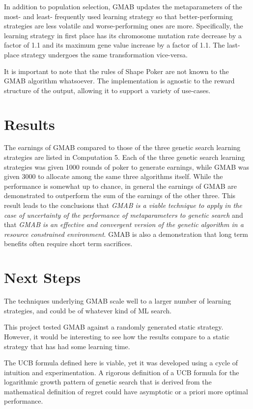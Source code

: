 \documentclass[11pt]{article}
\begin{document}
In addition to population selection, GMAB updates the metaparameters of the most- and least- frequently used learning strategy so that better-performing strategies are less volatile and worse-performing ones are more. Specifically, the learning strategy in first place has its chromosome mutation rate decrease by a factor of 1.1 and its maximum gene value increase by a factor of 1.1. The last-place strategy undergoes the same transformation vice-versa.

It is important to note that the rules of Shape Poker are not known to the GMAB algorithm whatsoever. The implementation is agnostic to the reward structure of the output, allowing it to support a variety of use-cases.

\section{Results}
The earnings of GMAB compared to those of the three genetic search learning strategies are listed in Computation 5. Each of the three genetic search learning strategies was given 1000 rounds of poker to generate earnings, while GMAB was given 3000 to allocate among the same three algorithms itself. While the performance is somewhat up to chance, in general the earnings of GMAB are demonstrated to outperform the sum of the earnings of the other three. This result leads to the conclusions that \textit{GMAB is a viable technique to apply in the case of uncertainty of the performance of metaparameters to genetic search} and that \textit{GMAB is an effective and convergent version of the genetic algorithm in a resource constrained environment}. GMAB is also a demonstration that long term benefits often require short term sacrifices.

\section{Next Steps}
The techniques underlying GMAB scale well to a larger number of learning strategies, and could be of whatever kind of ML search.

This project tested GMAB against a randomly generated static strategy. However, it would be interesting to see how the results compare to a static strategy that has had some learning time.

The UCB formula defined here is viable, yet it was developed using a cycle of intuition and experimentation. A rigorous definition of a UCB formula for the logarithmic growth pattern of genetic search that is derived from the mathematical definition of regret could have asymptotic or a priori more optimal performance.
\end{document}
